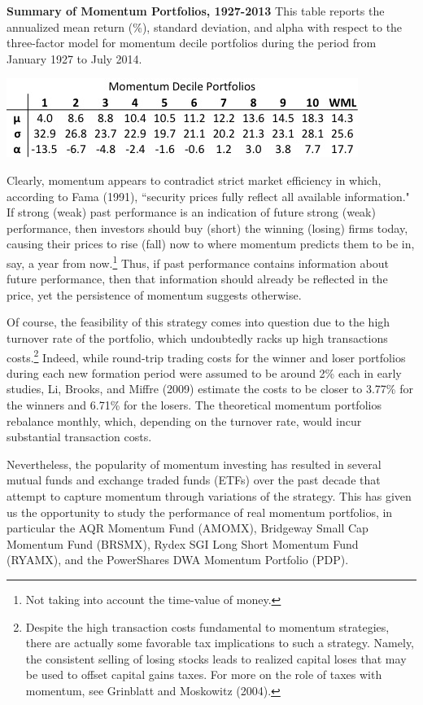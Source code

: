 \documentclass[12pt]{article}
\begin{document}
\begin{table}[h]
\centering
\caption{\textbf{Summary of Momentum Portfolios, 1927-2013} {\footnotesize This table reports the annualized mean return (\%), standard deviation, and alpha with respect to the three-factor model for momentum decile portfolios during the period from January 1927 to July 2014. }}
\includegraphics[scale=0.6]{Deciles.jpg}
\end{table}

Clearly, momentum appears to contradict strict market efficiency in which, according to Fama (1991), ``security prices fully reflect all available information." If strong (weak) past performance is an indication of future strong (weak) performance, then investors should buy (short) the winning (losing) firms today, causing their prices to rise (fall) now to where momentum predicts them to be in, say, a year from now.\footnote{Not taking into account the time-value of money.} Thus, if past performance contains information about future performance, then that information should already be reflected in the price, yet the persistence of momentum suggests otherwise.

Of course, the feasibility of this strategy comes into question due to the high turnover rate of the portfolio, which undoubtedly racks up high transactions costs.\footnote{Despite the high transaction costs fundamental to momentum strategies, there are actually some favorable tax implications to such a strategy. Namely, the consistent selling of losing stocks leads to realized capital loses that may be used to offset capital gains taxes. For more on the role of taxes with momentum, see Grinblatt and Moskowitz (2004).} Indeed, while round-trip trading costs for the winner and loser portfolios during each new formation period were assumed to be around 2\% each in early studies, Li, Brooks, and Miffre (2009) estimate the costs to be closer to 3.77\% for the winners and 6.71\% for the losers. The theoretical momentum portfolios rebalance monthly, which, depending on the turnover rate, would incur substantial transaction costs. 

Nevertheless, the popularity of momentum investing has resulted in several mutual funds and exchange traded funds (ETFs) over the past decade that attempt to capture momentum through variations of the strategy. This has given us the opportunity to study the performance of real momentum portfolios, in particular the AQR Momentum Fund (AMOMX), Bridgeway Small Cap Momentum Fund (BRSMX), Rydex SGI Long Short Momentum Fund (RYAMX), and the PowerShares DWA Momentum Portfolio (PDP).
\end{document}
